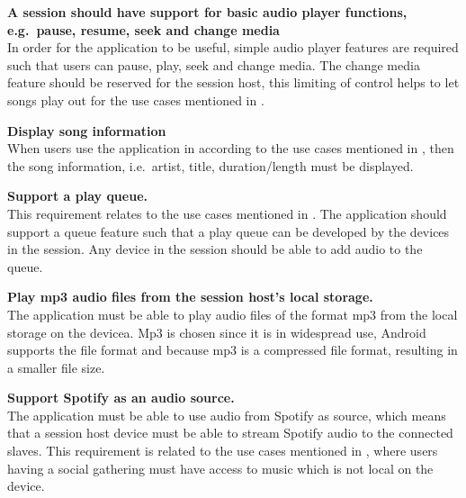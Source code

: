 \begin{eletterate}[resume]
    \item\label{req:basic} \textbf{A session should have support for basic audio player functions, e.g.~pause, resume, seek and change media} \hfill\\
        In order for the application to be useful, simple audio player features are required such that users can pause, play, seek and change media.
        The change media feature should be reserved for the session host, this limiting of control helps to let songs play out for the use cases mentioned in .

    \item\label{req:info} \textbf{Display song information} \hfill\\
        When users use the application in according to the use cases mentioned in ,
        then the song information, i.e.~artist, title, duration/length must be displayed.

    \item\label{req:queue} \textbf{Support a play queue.} \hfill\\
        This requirement relates to the use cases mentioned in .
        The application should support a queue feature such that a play queue can be developed by the devices in the session.
        Any device in the session should be able to add audio to the queue.

    \item\label{req:mp3} \textbf{Play mp3 audio files from the session host's local storage.} \hfill\\
        The application must be able to play audio files of the format mp3 from the local storage on the devicea.
        Mp3 is chosen since it is in widespread use, Android supports the file format and because mp3 is a compressed file format,
        resulting in a smaller file size\cite{android_mp3_support}\cite{mp3_compression}.

    \item\label{req:spotify} \textbf{Support Spotify as an audio source.} \hfill\\
        The application must be able to use audio from Spotify as source,
        which means that a session host device must be able to stream Spotify audio to the connected slaves.
        This requirement is related to the use cases mentioned in ,
        where users having a social gathering must have access to music which is not local on the device.
\end{eletterate}

